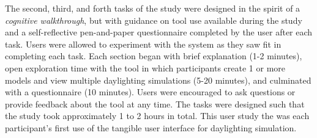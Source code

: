 \documentclass[review]{vgtc}                 %
\begin{document}
The second, third, and forth tasks of the study were designed in the
spirit of a \emph{cognitive walkthrough}, but with 
guidance on
tool use available during the study and a self-reflective
pen-and-paper questionnaire completed by the user after each task. 
Users were allowed to experiment with the system as they saw fit in
completing each task. 
%
Each section began with brief explanation (1-2 minutes), open
exploration time with the tool in which participants create 1 or more
models and view multiple daylighting simulations (5-20 minutes), and
culminated with a questionnaire (10 minutes).  Users were encouraged
to ask questions or provide feedback about the tool at any time.  The
tasks were designed such that the study took approximately 1 to 2
hours in total.  This user study the was each participant's first use
of the tangible user interface for daylighting simulation.




%
\end{document}
